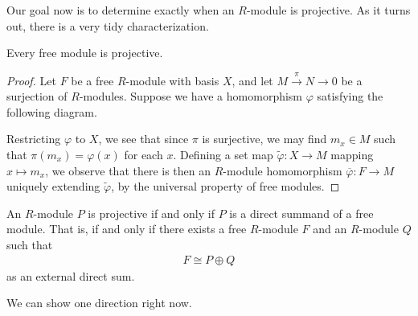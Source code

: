 \documentclass[10pt]{mypackage}
\begin{document}
Our goal now is to determine exactly when an $R$-module is projective. As it turns out, there is a very tidy characterization.
\begin{lemma}
  Every free module is projective.
\end{lemma}
\begin{proof}
  Let $F$ be a free $R$-module with basis $X$, and let $M\xrightarrow{\pi}N\rightarrow 0$ be a surjection of $R$-modules. Suppose we have a homomorphism $\varphi$ satisfying the following diagram.
  \begin{center}
  \end{center}
  Restricting $\varphi$ to $X$, we see that since $\pi$ is surjective, we may find $m_x\in M$ such that $\pi\left( m_x \right) = \varphi\left( x \right)$ for each $x$. Defining a set map $\widetilde{\varphi}\colon X\rightarrow M$ mapping $x\mapsto m_x$, we observe that there is then an $R$-module homomorphism $ \overline{\varphi}\colon F\rightarrow M $ uniquely extending $\widetilde{\varphi}$, by the universal property of free modules.
\end{proof}
\begin{theorem}
  An $R$-module $P$ is projective if and only if $P$ is a direct summand of a free module. That is, if and only if there exists a free $R$-module $F$ and an $R$-module $Q$ such that
  \begin{align*}
    F\cong P\oplus Q
  \end{align*}
  as an external direct sum.
\end{theorem}
We can show one direction right now.
\end{document}
